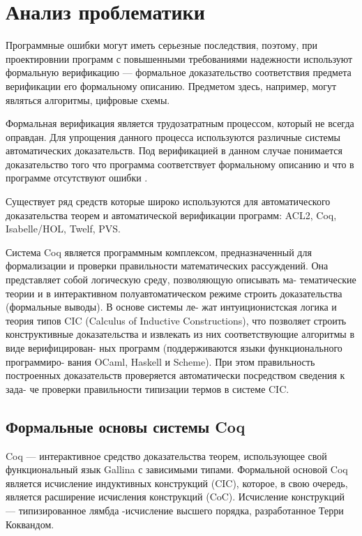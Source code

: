 \chapter{Анализ проблематики}
\label{chapter1}

Программные ошибки могут иметь серьезные последствия, поэтому, при 
проектировнии программ с повышенными требованиями надежности используют 
формальную верификацию --- формальное доказательство соответствия предмета 
верификации его формальному описанию. Предметом здесь, например, могут являться 
алгоритмы, цифровые схемы.

Формальная верификация является трудозатратным процессом, который не всегда 
оправдан. Для упрощения данного процесса используются  различные системы 
автоматических доказательств. Под верификацией в данном случае понимается 
доказательство того что программа соответствует формальному описанию и что в 
программе отсутствуют ошибки \cite{certified}.

Существует ряд средств которые широко используются для автоматического 
доказательства теорем и автоматической верификации программ: ACL2, Coq, 
Isabelle/HOL, Twelf, PVS.

Система Coq является программным комплексом, предназначенный для
формализации и проверки правильности математических рассуждений.
Она представляет собой логическую среду, позволяющую описывать ма-
тематические теории и в интерактивном полуавтоматическом режиме
строить доказательства (формальные выводы). В основе системы ле-
жат интуиционистская логика и теория типов CIC (Calculus of Inductive
Constructions), что позволяет строить конструктивные доказательства и
извлекать из них соответствующие алгоритмы в виде верифицирован-
ных программ (поддерживаются языки функционального программиро-
вания OCaml, Haskell и Scheme). При этом правильность построенных
доказательств проверяется автоматически посредством сведения к зада-
че проверки правильности типизации термов в системе CIC\cite{msu}.


\section{Формальные основы системы Coq}
Coq --- интерактивное средство доказательства теорем, использующее свой 
функциональный язык Gallina с зависимыми типами. Формальной основой Coq 
является исчисление индуктивных конструкций (CIC), которое, в свою очередь, является расширение 
исчисления конструкций (CoC). Исчисление конструкций --- типизированное лямбда
-исчисление высшего порядка, разработанное Терри Коквандом.


